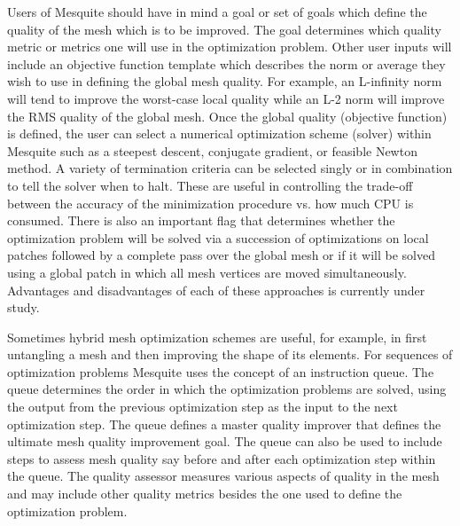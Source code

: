 \documentclass[letter]{report}
\begin{document}
Users of Mesquite should have in mind a goal or set of goals which define 
the quality of the mesh which is to be improved. The goal determines which
quality metric or metrics one will use in the optimization problem. Other 
user inputs will include an objective function template which describes 
the norm or average they wish to use in defining the global mesh quality. 
For example, an L-infinity norm will tend to improve the worst-case local 
quality while an L-2 norm will improve the RMS quality of the global mesh. 
Once the global quality (objective function) is defined, the user can 
select a numerical optimization scheme (solver) within Mesquite such as a 
steepest descent, conjugate gradient, or feasible Newton method. A variety of 
termination criteria can be selected singly or in combination to tell the 
solver when to halt. These are useful in controlling the trade-off between
the accuracy of the minimization procedure vs. how much CPU is consumed. 
There is also an important flag that determines whether the optimization 
problem will be solved via a succession of optimizations on local patches 
followed by a complete pass over the global mesh or if it will be solved using 
a global patch in which all mesh vertices are moved simultaneously. Advantages
and disadvantages of each of these approaches is currently under study.\newline

Sometimes hybrid mesh optimization schemes are useful, for example, in 
first untangling a mesh and then improving the shape of its elements. For 
sequences of optimization problems Mesquite uses the concept of an 
instruction queue.  The queue determines the order in which the optimization
problems are solved, using the output from the previous optimization step 
as the input to the next optimization step. The queue defines a master 
quality improver that defines the ultimate mesh quality improvement goal.
The queue can also be used to include steps to assess mesh quality say 
before and after each optimization step within the queue.  The quality 
assessor measures various aspects of quality in the mesh and may include 
other quality metrics besides the one used to define the optimization problem.
\newline
\end{document}
